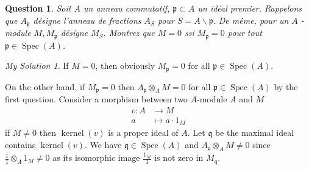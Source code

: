 \documentclass[]{article}
\newtheorem{prop}{Question}
\theoremstyle{remark}
\newtheorem*{sol}{My Solution}
\begin{document}
\begin{prop}
  Soit $A$ un anneau commutatif, $\mathfrak{p} \subset A$ un idéal premier. Rappelons que $A_{\mathfrak{p}}$ désigne l'anneau de fractions $A_{S}$ pour $S=A \backslash \mathfrak{p} .$ De même, pour un $A$ -module $M, M_{\mathfrak{p}}$ désigne $M_{S}$.
	Montrez que $M=0$ ssi $M_{\mathfrak{p}}=0$ pour tout $\mathfrak{p} \in \operatorname{Spec}(A)$.
\end{prop}

\begin{sol}
	If $ M =0 $, then obviously $M_{\mathfrak{p}}=0$ for all $\mathfrak{p} \in \operatorname{Spec}(A)$.
	
	On the other hand, if $M_{\mathfrak{p}}=0$ then $ A_{\mathfrak{p}} \otimes_{A} M = 0 $ for all $\mathfrak{p} \in \operatorname{Spec}(A)$ by the first question. 
	Consider a morphism between two $ A $-module $ A $ and $ M $
	\begin{align*}
		v: A &\rightarrow M \\
		a &\mapsto a\cdot 1_M
	\end{align*}
	if $ M \ne 0 $ then $ \operatorname{kernel}(v) $ is a proper ideal of $ A $. Let $ \mathfrak{q} $ be the maximal ideal contains $ \operatorname{kernel}(v) $. We have $\mathfrak{q} \in \operatorname{Spec}(A)$ and $ A_{\mathfrak{q}} \otimes_{A} M \ne 0 $ since $ \frac{1}{1} \otimes_{A} 1_M \ne 0 $ as its isomorphic image $ \frac{1_M}{1} $ is not zero in $ M_{\mathfrak{q}} $.
\end{sol}
\end{document}
